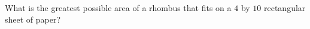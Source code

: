 What is the greatest possible area of a rhombus that fits on a $4$ by $10$ rectangular sheet of paper?

